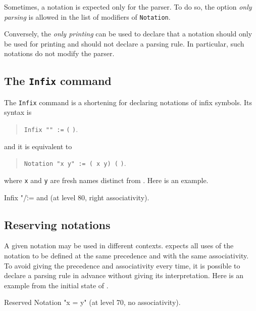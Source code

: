 \Rem
Sometimes, a notation is expected only for the parser.
To do so, the option {\em only parsing} is allowed in the list of modifiers of
\texttt{Notation}.

Conversely, the {\em only printing} can be used to declare
that a notation should only be used for printing and should not declare a
parsing rule. In particular, such notations do not modify the parser.

\subsection{The \texttt{Infix} command
}

The \texttt{Infix} command is a shortening for declaring notations of
infix symbols. Its syntax is 

\begin{quote}
\noindent\texttt{Infix "{\symbolentry}" :=} {\qualid} {\tt (}  {\tt )}.
\end{quote}

and it is equivalent to

\begin{quote}
\noindent\texttt{Notation "x {\symbolentry} y" := ({\qualid} x y)  (}  {\tt )}.
\end{quote}

where {\tt x} and {\tt y} are fresh names distinct from {\qualid}. Here is an example.

\begin{coq_example*}
Infix "/\" := and (at level 80, right associativity).
\end{coq_example*}

\subsection{Reserving notations
\label{ReservedNotation}
}

A given notation may be used in different contexts. {\Coq} expects all
uses of the notation to be defined at the same precedence and with the
same associativity. To avoid giving the precedence and associativity
every time, it is possible to declare a parsing rule in advance
without giving its interpretation. Here is an example from the initial
state of {\Coq}.

\begin{coq_example}
Reserved Notation "x = y" (at level 70, no associativity).
\end{coq_example}

